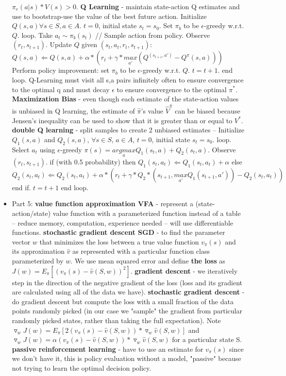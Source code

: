 \documentclass{article}
\begin{document}
\begin{itemize}
$\pi_e(a|s)*V(s) > 0$. \textbf{Q Learning} - maintain state-action Q estimates and use to bootstrap-use the value of the best future action. Initialize $Q(s, a) \forall s \in S, a \in A$. $t = 0$, initial state $s_t = s_0$. Set $\pi_b$ to be $\epsilon$-greedy w.r.t. $Q$. loop. Take $a_t \sim \pi_b(s_t)$ // Sample action from policy. Observe $(r_t, s_{t+1})$. Update $Q$ given $(s_t, a_t, r_t, s_{t+1})$: $Q(s, a) \Leftarrow Q(s, a) + \alpha*(r_t + \gamma*\underset{a'}{max}(Q^(s_{t+1}, a') - Q^\pi(s, a)))$ Perform policy improvement: set $\pi_b$ to be $\epsilon$-greedy w.r.t. $Q$. $t = t + 1$. end loop. Q-Learning must visit all s,a pairs infinitely often to ensure convergence to the optimal q and must decay $\epsilon$ to ensure convergence to the optimal $\pi^*$. \textbf{Maximization Bias} - even though each estimate of the state-action values is unbiased in Q learning, the estimate of $\hat{\pi}$'s value $\hat{V}^{\hat{\pi}}$ can be biased because Jensen's inequality can be used to show that it is greater than or equal to $V^*$. \textbf{double Q learning} - split samples to create 2 unbiased estimates -- Initialize $Q_1(s, a)$ and $Q_2(s, a)$, $\forall s \in S$, $a \in A$, $t = 0$, initial state $s_t = s_0$. loop. Select $a_t$ using $\epsilon$-greedy $\pi(s) = \underset{a}{argmax} Q_1(s_t, a) + Q_2(s_t, a)$. Observe $(r_t, s_{t+1})$. if (with 0.5 probability) then $Q_1(s_t, a_t) \Leftarrow Q_1(s_t, a_t) + \alpha$ else $Q_2(s_t, a_t) \Leftarrow Q_2(s_t, a_t) + \alpha*(r_t + \gamma*Q_2*(s_{t+1}, \underset{a'}{max} Q_1(s_{t+1}, a')) - Q_2(s_t, a_t))$ end if. $t = t + 1$ end loop. 
\item Part 5: \textbf{value function approximation VFA} - represent a (state-action/state) value function with a parameterized function instead of a table -- reduce memory, computation, experience needed -- will use differentiable functions. \textbf{stochastic gradient descent SGD} - to find the parameter vector $w$ that minimizes the loss between a true value function $v_\pi(s)$ and its approximation $\hat{v}$ as represented with a particular function class parameterized by $w$. We use mean squared error and define \textbf{the loss} as $J(w) = E_\pi[(v_\pi(s) - \hat{v}(S,w))^2]$. \textbf{gradient descent} - we iteratively step in the direction of the negative gradient of the loss (loss and its gradient are calculated using all of the data we have). \textbf{stochastic gradient descent} - do gradient descent but compute the loss with a small fraction of the data points randomly picked (in our case we "sample" the gradient from particular randomly picked states, rather than taking the full expectation). Note $\triangledown_w J(w) = E_\pi[2(v_\pi(s) - \hat{v}(S,w))*\triangledown_w \hat{v}(S,w)]$ and $\triangledown_w J(w) = \alpha(v_\pi(s) - \hat{v}(S,w))*\triangledown_w \hat{v}(S,w)$ for a particular state S. \textbf{passive reinforcement learning} - have to use an estimate for $v_\pi(s)$ since we don't have it, this is policy evaluation without a model, "passive" because not trying to learn the optimal decision policy.  
\end{itemize}
\end{document}
